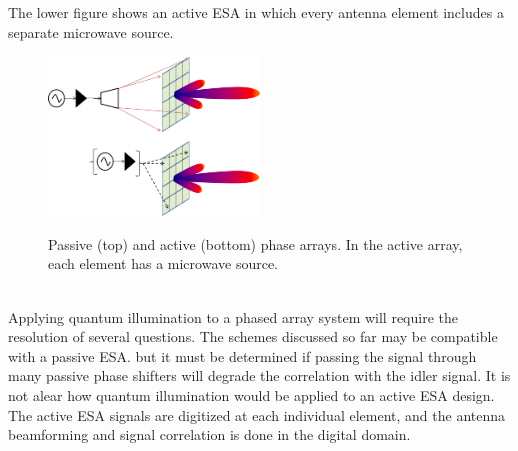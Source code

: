 \documentclass[a4paper,11pt, twocolumn]{article}
\numberwithin{equation}{section}
\begin{document}
The lower figure shows an active ESA in which every antenna element includes a separate microwave source.
\begin{figure}
 \caption{Passive (top) and active (bottom) phase arrays. In the active array, each element has a microwave source.}
 \centering
   \includegraphics[width=0.5\textwidth]{figs/PhasedArrays}
 \label{fig:phasedarrays}
\end{figure}
\\
Applying quantum illumination to a phased array system will require the resolution of several questions.
The schemes discussed so far may be compatible with a passive ESA. but it must be determined if passing the signal through many passive phase shifters will degrade the correlation with the idler signal.
It is not alear how quantum illumination would be applied to an active ESA design. The active ESA signals are digitized at each individual element, and the antenna beamforming and signal correlation is done in the digital domain.

\printbibliography
\end{document}
